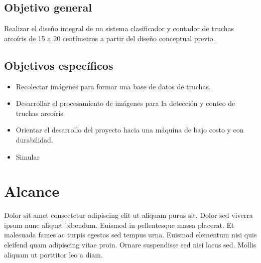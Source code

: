 \subsection{Objetivo general}

Realizar el diseño integral de un sistema clasificador y contador de truchas arcoíris de 15 a 20 centímetros a partir del diseño conceptual previo.

\subsection{Objetivos específicos}

\begin{itemize}
	\item Recolectar imágenes para formar una base de datos de truchas.
	\item Desarrollar el procesamiento de imágenes para la detección y conteo de truchas arcoíris.
	\item Orientar el desarrollo del proyecto hacia una máquina de bajo costo y con durabilidad.
	\item Simular 	
	
\end{itemize}


\section{Alcance}

Dolor sit amet consectetur adipiscing elit ut aliquam purus sit. Dolor sed viverra ipsum nunc aliquet bibendum. Euismod in pellentesque massa placerat. Et malesuada fames ac turpis egestas sed tempus urna. Euismod elementum nisi quis eleifend quam adipiscing vitae proin. Ornare suspendisse sed nisi lacus sed. Mollis aliquam ut porttitor leo a diam.


